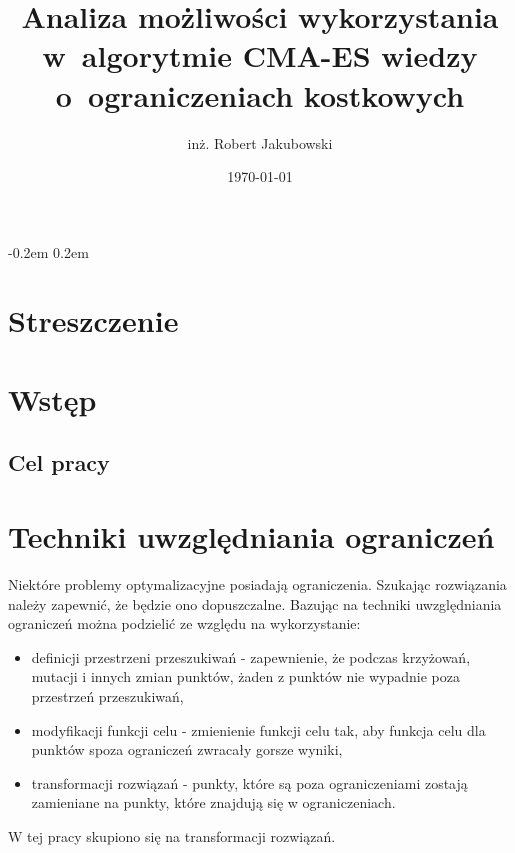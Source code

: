 \documentclass{mini}
\title{Analiza możliwości wykorzystania w~algorytmie CMA-ES wiedzy o~ograniczeniach kostkowych}
\author{inż. Robert Jakubowski}
\date{\today}
\begin{document}
\maketitle

\pagebreak
\thispagestyle{empty}

\openup -0.2em %
\tableofcontents
\openup 0.2em %

\thispagestyle{empty}
\raggedbottom
\pagebreak


\section{Streszczenie}

\pagebreak

\section{Wstęp}

\subsection{Cel pracy}

\pagebreak

\section{Techniki uwzględniania ograniczeń}
Niektóre problemy optymalizacyjne posiadają ograniczenia. Szukając rozwiązania należy zapewnić, że będzie ono dopuszczalne. Bazując na \cite{wyklady} techniki uwzględniania ograniczeń można podzielić ze względu na wykorzystanie:
\begin{itemize}[noitemsep]
\item definicji przestrzeni przeszukiwań - zapewnienie, że podczas krzyżowań, mutacji i innych zmian punktów, żaden z punktów nie wypadnie poza przestrzeń przeszukiwań,
\item modyfikacji funkcji celu - zmienienie funkcji celu tak, aby funkcja celu dla punktów spoza ograniczeń zwracały gorsze wyniki,
\item transformacji rozwiązań - punkty, które są poza ograniczeniami zostają zamieniane na punkty, które znajdują się w ograniczeniach.
\end{itemize}

W tej pracy skupiono się na transformacji rozwiązań.
\end{document}
